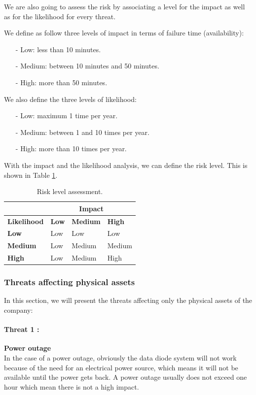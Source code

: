 \documentclass[a4paper,10pt]{article}
\begin{document}
We are also going to assess the risk by associating a level for the impact as well as for the likelihood for every threat. 

We define as follow three levels of impact in terms of failure time (availability):
\begin{enumerate}
	\item[-] Low: less than 10 minutes.
	\item[-] Medium: between 10 minutes and 50 minutes.
	\item[-] High: more than 50 minutes.
\end{enumerate}

We also define the three levels of likelihood:
\begin{enumerate}
	\item[-] Low: maximum 1 time per year.
	\item[-] Medium: between 1 and 10 times per year.
	\item[-] High: more than 10 times per year.
\end{enumerate}

With the impact and the likelihood analysis, we can define the risk level. This is shown in Table \ref{tab:risk}.

\begin{table}[!h]
	\centering
	\begin{tabular}{|l|l|l|l|}
		\hline
		 & \multicolumn{3}{|c|}{\textbf{Impact}}  \\ \hline
		\textbf{Likelihood} & \textbf{Low} & \textbf{Medium} & \textbf{High} \\ \hline
		\textbf{Low}& Low & Low & Low \\ \hline
		\textbf{Medium} & Low & Medium & Medium \\ \hline
		\textbf{High} & Low & Medium &  High \\ \hline
	\end{tabular}
	\caption{Risk level assessment.}
	\label{tab:risk}
\end{table}

\subsubsection{Threats affecting physical assets}
In this section, we will present the threats affecting only the physical assets of the company:


\paragraph{Threat 1 :}  \textbf{Power outage}\\
\indent In the case of a power outage, obviously the data diode system will not work because of the need for an electrical power source, which means it will not be available until the power gets back. A power outage usually does not exceed one hour which mean there is not a high impact.
\end{document}
